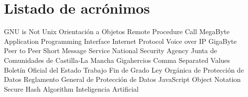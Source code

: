 \chapter{Listado de acrónimos}

{\small
\begin{acronym}[XXXXXXXX]
       {\acs{GNU} is Not Unix}
        {Orientación a Objetos}
       {Remote Procedure Call}
        {MegaByte}
       {Application Programming Interface}
        {Internet Protocol}
      {Voice over \acs{IP}}
        {GigaByte}
       {Peer to Peer}
       {Short Message Service}
       {National Security Agency}
      {Junta de Comunidades de Castilla-La Mancha}
  	 {Gigahercios}
       {Comma Separated Values}
       {Boletín Oficial del Estado}
       {Trabajo Fin de Grado}
     {Ley Orgánica de Protección de Datos}
    {Reglamento General de Protección de Datos}
    {JavaScript Object Notation}
      {Secure Hash Algorithm}
          {Inteligencia Artificial}
\end{acronym}
}




